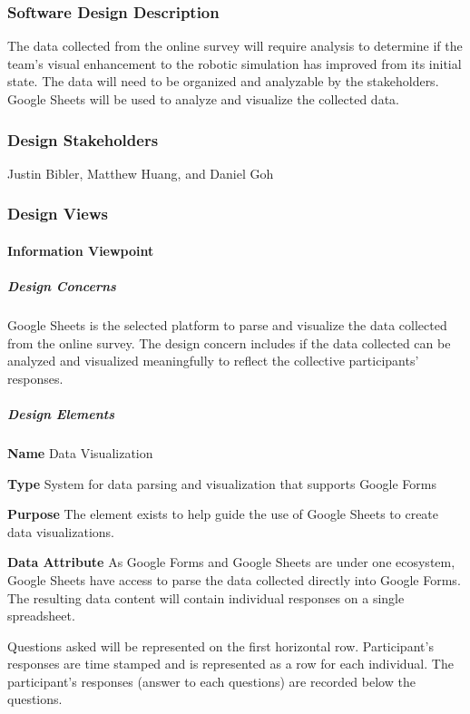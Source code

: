 \begin{flushleft}
\normalsize
\subsubsection{Software Design Description}
The data collected from the online survey will require analysis to determine if the team's visual enhancement to the robotic simulation has improved from its initial state.
The data will need to be organized and analyzable by the stakeholders.
Google Sheets will be used to analyze and visualize the collected data.

\subsubsection{Design Stakeholders}
Justin Bibler, Matthew Huang, and Daniel Goh

\subsubsection{Design Views}
\paragraph{Information Viewpoint}
\subparagraph{Design Concerns}
Google Sheets \cite{googlesheets} is the selected platform to parse and visualize the data collected from the online survey. 
The design concern includes if the data collected can be analyzed and visualized meaningfully to reflect the collective participants’ responses.
\vspace{3mm}

\subparagraph{Design Elements}
\textbf{Name}
Data Visualization

\textbf{Type}
System for data parsing and visualization that supports Google Forms 

\textbf{Purpose}
The element exists to help guide the use of Google Sheets to create data visualizations.

\textbf{Data Attribute}
As Google Forms and Google Sheets are under one ecosystem, Google Sheets have access to parse the data collected directly into Google Forms. 
The resulting data content will contain individual responses on a single spreadsheet. 

Questions asked will be represented on the first horizontal row. 
Participant's responses are time stamped and is represented as a row for each individual. 
The participant's responses (answer to each questions) are recorded below the questions. 


\end{flushleft}
